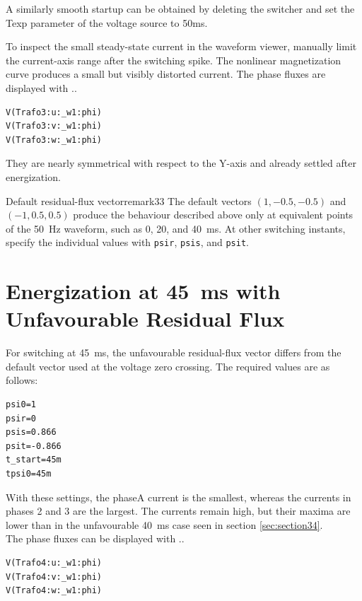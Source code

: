 A similarly smooth startup can be obtained by deleting the switcher and set the Texp parameter of the voltage source to 50ms.

To inspect the small steady-state current in the waveform viewer, manually
limit the current-axis range after the switching spike. The nonlinear
magnetization curve produces a small but visibly distorted current. The phase
fluxes are displayed with ..

\begin{lstlisting}[style=LTspice]
V(Trafo3:u:_w1:phi)
V(Trafo3:v:_w1:phi)
V(Trafo3:w:_w1:phi)
\end{lstlisting}

They are nearly symmetrical with respect to the Y-axis and already settled after energization.

\begin{remark}{Default residual-flux vector}{remark33}
The default vectors $(1,-0.5,-0.5)$ and $(-1,0.5,0.5)$ produce the behaviour
described above only at equivalent points of the \SI{50}{\hertz} waveform,
such as 0, 20, and \SI{40}{\milli\second}. At other switching instants, specify
the individual values with \texttt{psir}, \texttt{psis}, and \texttt{psit}.
\end{remark}

\section{Energization at \SI{45}{\milli\second} with Unfavourable Residual Flux}
\label{sec:section36}

For switching at \SI{45}{\milli\second}, the unfavourable residual-flux vector
differs from the default vector used at the voltage zero crossing. The required
values are as follows:

\begin{lstlisting}[style=LTspice]
psi0=1
psir=0
psis=0.866
psit=-0.866
t_start=45m
tpsi0=45m
\end{lstlisting}

With these settings, the phaseA current is the smallest, whereas the currents
in phases 2 and 3 are the largest. The currents remain high, but their maxima
are lower than in the unfavourable \SI{40}{\milli\second} case seen in section
\ref{sec:section34}.\\

The phase fluxes can be displayed with ..
\begin{lstlisting}[style=LTspice]
V(Trafo4:u:_w1:phi)
V(Trafo4:v:_w1:phi)
V(Trafo4:w:_w1:phi)
\end{lstlisting}

